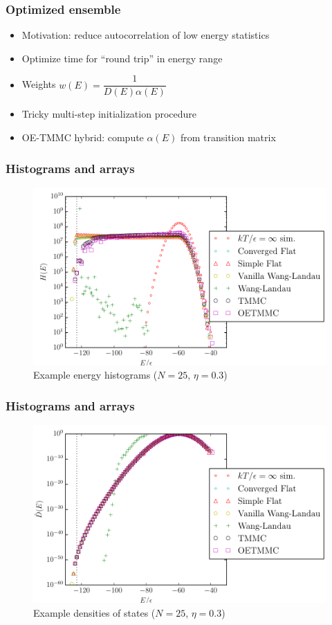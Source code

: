 \documentclass{beamer}
\newcommand{\p}[1]{\left(#1\right)} %
\newcommand{\f}[2]{\dfrac{#1}{#2}}
\let\olditem\item
\renewcommand{\item}{\setlength{\itemsep}{6pt}\olditem}
\begin{document}
\begin{frame}
  \frametitle{Optimized ensemble}
  \begin{itemize}
  \item Motivation: reduce autocorrelation of low energy statistics
  \item Optimize time for ``round trip'' in energy range
  \item Weights $w\p{E}=\f1{D\p{E}\alpha\p{E}}$
  \item Tricky multi-step initialization procedure
  \item OE-TMMC hybrid: compute $\alpha\p{E}$ from transition matrix
  \end{itemize}
\end{frame}

\begin{frame}
  \frametitle{Histograms and arrays}
  \begin{figure}
    \centering
    \includegraphics[height=0.75\textheight]{figs/hist-example.pdf}
    \caption{Example energy histograms ($N=25$, $\eta=0.3$)}
  \end{figure}
\end{frame}

\begin{frame}
  \frametitle{Histograms and arrays}
  \begin{figure}
    \centering
    \includegraphics[height=0.75\textheight]{figs/dos-example.pdf}
    \caption{Example densities of states ($N=25$, $\eta=0.3$)}
  \end{figure}
\end{frame}
\end{document}
